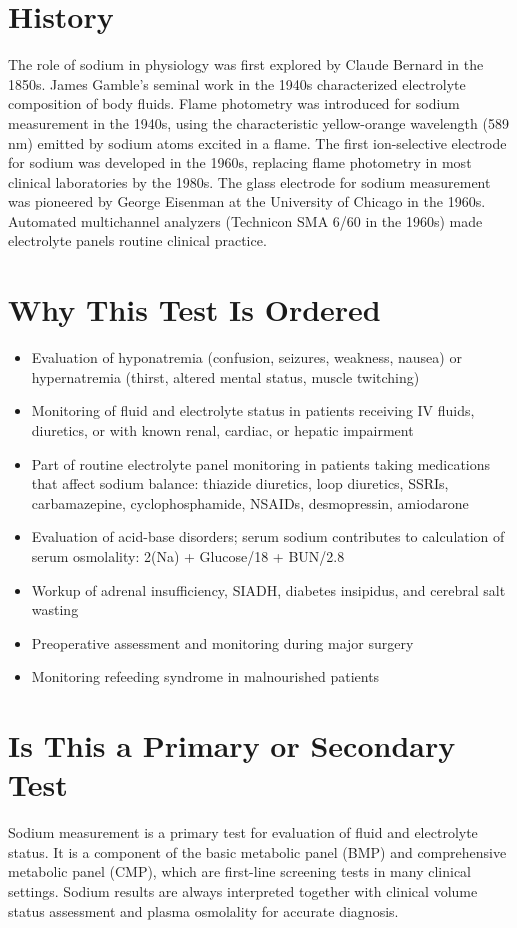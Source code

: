 \section*{History}
The role of sodium in physiology was first explored by Claude Bernard in the 1850s. James Gamble's seminal work in the 1940s characterized electrolyte composition of body fluids. Flame photometry was introduced for sodium measurement in the 1940s, using the characteristic yellow-orange wavelength (589 nm) emitted by sodium atoms excited in a flame. The first ion-selective electrode for sodium was developed in the 1960s, replacing flame photometry in most clinical laboratories by the 1980s. The glass electrode for sodium measurement was pioneered by George Eisenman at the University of Chicago in the 1960s. Automated multichannel analyzers (Technicon SMA 6/60 in the 1960s) made electrolyte panels routine clinical practice.

\section*{Why This Test Is Ordered}
\begin{itemize}
  \item Evaluation of hyponatremia (confusion, seizures, weakness, nausea) or hypernatremia (thirst, altered mental status, muscle twitching)
  \item Monitoring of fluid and electrolyte status in patients receiving IV fluids, diuretics, or with known renal, cardiac, or hepatic impairment
  \item Part of routine electrolyte panel monitoring in patients taking medications that affect sodium balance: thiazide diuretics, loop diuretics, SSRIs, carbamazepine, cyclophosphamide, NSAIDs, desmopressin, amiodarone
  \item Evaluation of acid-base disorders; serum sodium contributes to calculation of serum osmolality: 2(Na) + Glucose/18 + BUN/2.8
  \item Workup of adrenal insufficiency, SIADH, diabetes insipidus, and cerebral salt wasting
  \item Preoperative assessment and monitoring during major surgery
  \item Monitoring refeeding syndrome in malnourished patients
\end{itemize}

\section*{Is This a Primary or Secondary Test}
Sodium measurement is a primary test for evaluation of fluid and electrolyte status. It is a component of the basic metabolic panel (BMP) and comprehensive metabolic panel (CMP), which are first-line screening tests in many clinical settings. Sodium results are always interpreted together with clinical volume status assessment and plasma osmolality for accurate diagnosis.

